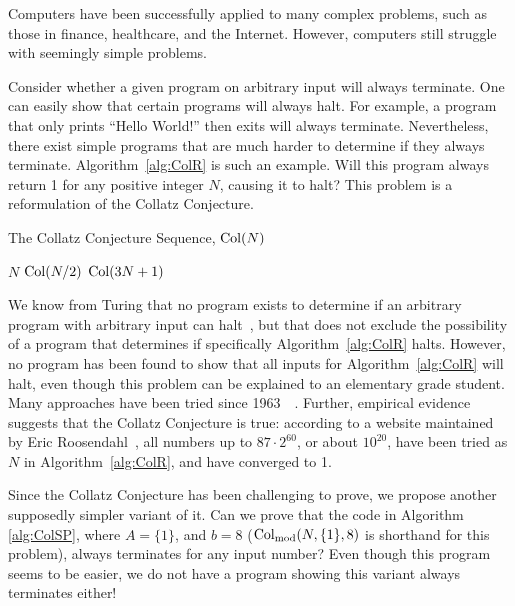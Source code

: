 Computers have been successfully applied to many complex problems, such as those in finance, healthcare, and the Internet. However, computers still struggle with seemingly simple problems. \par
Consider whether a given program on arbitrary input will always terminate. One can easily show that certain programs will always halt. For example, a program that only prints ``Hello World!'' then exits will always terminate. Nevertheless, there exist simple programs that are much harder to determine if they always terminate. Algorithm~\ref{alg:ColR} is such an example. Will this program always return 1 for any positive integer $N$, causing it to halt? This problem is a reformulation of the Collatz Conjecture. \par
\begin{algorithm} 
\caption{The Collatz Conjecture Sequence, $\mathrm{Col}(N)$}
\label{alg:ColR} 
\begin{algorithmic}[1]
     \Return $N$ 
    \EndIf
     \Return $\mathrm{Col}(N/2)$
    \EndIf
    \State \Return $\mathrm{Col}(3N + 1)$ 
\end{algorithmic}
\end{algorithm}
We know from Turing that no program exists to determine if an arbitrary program with arbitrary input can halt~\cite{Turing1936}, but that does not exclude the possibility of a program that determines if specifically Algorithm~\ref{alg:ColR} halts. However, no program has been found to show that all inputs for Algorithm~\ref{alg:ColR} will halt, even though this problem can be explained to an elementary grade student. Many approaches have been tried since 1963~\cite{2003mathLagrais}~\cite{2006mathLagrias}. Further, empirical evidence suggests that the Collatz Conjecture is true: according to a website maintained by Eric Roosendahl~\cite{EricRoose}, all numbers up to $87 \cdot 2^{60}$, or about $10^{20}$, have been tried as $N$ in Algorithm~\ref{alg:ColR}, and have converged to 1. \par
Since the Collatz Conjecture has been challenging to prove, we propose another supposedly simpler variant of it. Can we prove that the code in Algorithm \ref{alg:ColSP}, where $A = \{1\}$, and $b = 8$ ($\mathrm{Col}_{\text{mod}}(N,\{1\},8)$ is shorthand for this problem), always terminates for any input number? Even though this program seems to be easier, we do not have a program showing this variant always terminates either! \par
